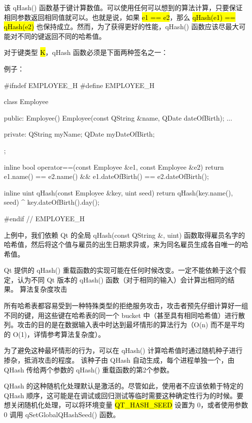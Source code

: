 该 qHash() 函数基于键计算数值。可以使用任何可以想到的算法计算，只要保证相同参数返回相同值就可以。也就是说，如果 \hl{e1 == e2}，那么 \hl{qHash(e1) == qHash(e2)} 也保持成立。然而，为了获得更好的性能，qHash() 函数应该尽最大可能对不同的键返回不同的哈希值。

对于键类型 \hl{K}，qHash 函数必须是下面两种签名之一：


例子：

\begin{cppcode}
#ifndef EMPLOYEE_H
#define EMPLOYEE_H

class Employee
{
public:
    Employee() {}
    Employee(const QString &name, QDate dateOfBirth);
    ...

private:
    QString myName;
    QDate myDateOfBirth;
};

inline bool operator==(const Employee &e1, const Employee &e2)
{
    return e1.name() == e2.name()
           && e1.dateOfBirth() == e2.dateOfBirth();
}

inline uint qHash(const Employee &key, uint seed)
{
    return qHash(key.name(), seed) ^ key.dateOfBirth().day();
}

#endif // EMPLOYEE_H
\end{cppcode}

上例中，我们依赖 Qt 的全局 qHash(const QString \&, uint) 函数取得雇员名字的哈希值，然后将这个值与雇员的出生日期求异或，来为同名雇员生成各自唯一的哈希值。

\begin{notice}
Qt 提供的 qHash() 重载函数的实现可能在任何时候改变。一定不能依赖于这个假定，认为不同 Qt 版本的 qHash() 函数（对于相同的输入）会计算出相同的结果。
算法复杂度攻击
\end{notice}

所有哈希表都容易受到一种特殊类型的拒绝服务攻击，攻击者预先仔细计算好一组不同的键，用这些键在哈希表的同一个 bucket 中（甚至具有相同哈希值）进行散列。攻击的目的是在数据输入表中时达到最坏情形的算法行为（O(n) 而不是平均的 O(1)，详情参考算法复杂度）。

为了避免这种最坏情形的行为，可以在 qHash() 计算哈希值时通过随机种子进行掺杂，抵消攻击的程度。 该种子由 QHash 自动生成，每个进程单独一个，由 QHash 传给两个参数的 qHash() 重载函数的第2个参数。

QHash 的这种随机化处理默认是激活的。尽管如此，使用者不应该依赖于特定的 QHash 顺序，这可能是在调试或回归测试等临时需要这种确定性行为的时候。要想关闭随机化处理，可以将环境变量 \hl{QT\_HASH\_SEED} 设置为 0，或者使用参数 0 调用 qSetGlobalQHashSeed() 函数。

